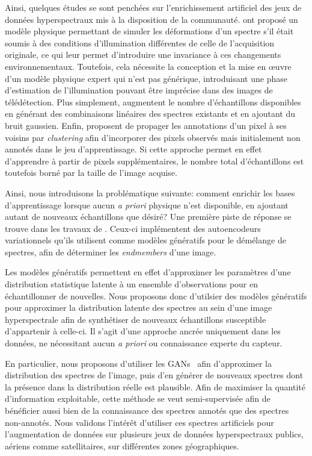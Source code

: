 Ainsi, quelques études se sont penchées sur l'enrichissement artificiel des jeux de données hyperspectraux mis à la disposition de la communauté. \citet{windrim_hyperspectral_2016} ont proposé un modèle physique permettant de simuler les déformations d'un spectre s'il était soumis à des conditions d'illumination différentes de celle de l'acquisition originale, ce qui leur permet d'introduire une invariance à ces changements environnementaux. Toutefois, cela nécessite la conception et la mise en \oe{}uvre d'un modèle physique expert qui n'est pas générique, introduisant une phase d'estimation de l'illumination pouvant être imprécise dans des images de télédétection. Plus simplement, \citet{chen_deep_2016} augmentent le nombre d'échantillons disponibles en générant des combinaisons linéaires des spectres existants et en ajoutant du bruit gaussien. Enfin, \citet{acquarelli_convolutional_2017} proposent de propager les annotations d'un pixel à ses voisins par \emph{clustering} afin d'incorporer des pixels observés mais initialement non annotés dans le jeu d'apprentissage. Si cette approche permet en effet d'apprendre à partir de pixels supplémentaires, le nombre total d'échantillons est toutefois borné par la taille de l'image acquise.

Ainsi, nous introduisons la problématique suivante: comment enrichir les bases d'apprentissage lorsque aucun \emph{a priori} physique n'est disponible, en ajoutant autant de nouveaux échantillons que désiré? Une première piste de réponse se trouve dans les travaux de \citet{gemp_inverting_2017}. Ceux-ci implémentent des autoencodeurs variationnels qu'ils utilisent comme modèles génératifs pour le démélange de spectres, afin de déterminer les \emph{endmembers} d'une image.

Les modèles génératifs permettent en effet d'approximer les paramètres d'une distribution statistique latente à un ensemble d'observations pour en échantillonner de nouvelles. Nous proposons donc d'utilsier des modèles génératifs pour approximer la distribution latente des spectres au sein d'une image hyperspectrale afin de synthétiser de nouveaux échantillons susceptible d'appartenir à celle-ci. Il s'agit d'une approche ancrée uniquement dans les données, ne nécessitant aucun \emph{a priori} ou connaissance experte du capteur.

En particulier, nous proposons d'utiliser les \glspl{GAN}~\cite{goodfellow_generative_2014} afin d'approximer la distribution des spectres de l'image, puis d'en générer de nouveaux spectres dont la présence dans la distribution réelle est plausible. Afin de maximiser la quantité d'information exploitable, cette méthode se veut semi-supervisée afin de bénéficier aussi bien de la connaissance des spectres annotés que des spectres non-annotés. Nous validons l'intérêt d'utiliser ces spectres artificiels pour l'augmentation de données sur plusieurs jeux de données hyperspectraux publics, aériens comme satellitaires, sur différentes zones géographiques.

